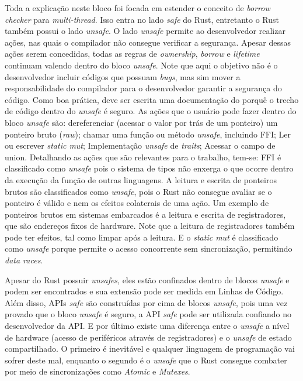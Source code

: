 Toda a explicação neste bloco foi focada em estender o conceito de \textit{borrow checker} para \textit{multi-thread}. Isso entra no lado \textit{safe} do Rust, entretanto o Rust também possui o lado \textit{unsafe}. O lado \textit{unsafe} permite ao desenvolvedor realizar ações, nas quais o compilador não consegue verificar a segurança. Apesar dessas ações serem concedidas, todas as regras de \textit{ownership}, \textit{borrow} e \textit{lifetime} continuam valendo dentro do bloco \textit{unsafe}. Note que aqui o objetivo não é o desenvolvedor incluir códigos que possuam \textit{bugs}, mas sim mover a responsabilidade do compilador para o desenvolvedor garantir a segurança do código. Como boa prática, deve ser escrita uma documentação do porquê o trecho de código dentro do \textit{unsafe} é seguro. As ações que o usuário pode fazer dentro do bloco \textit{unsafe} são: dereferenciar (acessar o valor por trás de um ponteiro) um ponteiro bruto (\textit{raw}); chamar uma função ou método \textit{unsafe}, incluindo \ac{FFI}; Ler ou escrever \textit{static mut}; Implementação \textit{unsafe} de \textit{traits}; Acessar o campo de union. Detalhando as ações que são relevantes para o trabalho, tem-se: \ac{FFI} é classificado como \textit{unsafe} pois o sistema de tipos não enxerga o que ocorre dentro da execução da função de outras linguagens. A leitura e escrita de ponteiros brutos são classificados como \textit{unsafe}, pois o Rust não consegue avaliar se o ponteiro é válido e nem os efeitos colaterais de uma ação. Um exemplo de ponteiros brutos em sistemas embarcados é a leitura e escrita de registradores, que são endereços fixos de hardware. Note que a leitura de registradores também pode ter efeitos, tal como limpar após a leitura. E o \textit{static mut} é classificado como \textit{unsafe} porque permite o acesso concorrente sem sincronização, permitindo \textit{data races}.

Apesar do Rust possuir \textit{unsafes}, eles estão confinados dentro de blocos \textit{unsafe} e podem ser encontrados e sua extensão pode ser medida em Linhas de Código. Além disso, \acp{API} \textit{safe} são construídas por cima de blocos \textit{unsafe}, pois uma vez provado que o bloco \textit{unsafe} é seguro, a \ac{API} \textit{safe} pode ser utilizada confiando no desenvolvedor da \ac{API}. E por último existe uma diferença entre o \textit{unsafe} a nível de hardware (acesso de periféricos através de registradores) e o \textit{unsafe} de estado compartilhado. O primeiro é inevitável e qualquer linguagem de programação vai sofrer deste mal, enquanto o segundo é o \textit{unsafe} que o Rust consegue combater por meio de sincronizações como \textit{Atomic} e \textit{Mutexes}.
